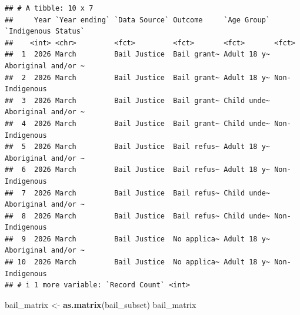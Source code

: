 \documentclass[
]{article}
\newenvironment{Shaded}{\begin{snugshade}}{\end{snugshade}}
\newcommand{\FunctionTok}[1]{\textcolor[rgb]{0.13,0.29,0.53}{\textbf{#1}}}
\newcommand{\NormalTok}[1]{#1}
\newcommand{\OtherTok}[1]{\textcolor[rgb]{0.56,0.35,0.01}{#1}}
\begin{document}
\begin{verbatim}
## # A tibble: 10 x 7
##     Year `Year ending` `Data Source` Outcome     `Age Group` `Indigenous Status`
##    <int> <chr>         <fct>         <fct>       <fct>       <fct>              
##  1  2026 March         Bail Justice  Bail grant~ Adult 18 y~ Aboriginal and/or ~
##  2  2026 March         Bail Justice  Bail grant~ Adult 18 y~ Non-Indigenous     
##  3  2026 March         Bail Justice  Bail grant~ Child unde~ Aboriginal and/or ~
##  4  2026 March         Bail Justice  Bail grant~ Child unde~ Non-Indigenous     
##  5  2026 March         Bail Justice  Bail refus~ Adult 18 y~ Aboriginal and/or ~
##  6  2026 March         Bail Justice  Bail refus~ Adult 18 y~ Non-Indigenous     
##  7  2026 March         Bail Justice  Bail refus~ Child unde~ Aboriginal and/or ~
##  8  2026 March         Bail Justice  Bail refus~ Child unde~ Non-Indigenous     
##  9  2026 March         Bail Justice  No applica~ Adult 18 y~ Aboriginal and/or ~
## 10  2026 March         Bail Justice  No applica~ Adult 18 y~ Non-Indigenous     
## # i 1 more variable: `Record Count` <int>
\end{verbatim}

\begin{Shaded}
\begin{Highlighting}[]
\NormalTok{bail\_matrix }\OtherTok{\textless{}{-}} \FunctionTok{as.matrix}\NormalTok{(bail\_subset)}
\NormalTok{bail\_matrix}
\end{Highlighting}
\end{Shaded}
\end{document}
